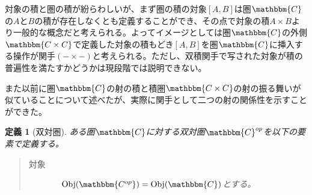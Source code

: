 \documentclass[dvipdfmx]{jsarticle}
\newcommand{\cat}[1]{\mathbbm{#1}}
\newcommand{\obj}[1]{\mathrm{Obj}(\cat{#1})}
\newcommand{\pcobj}[1]{[#1]}
\newtheorem{define}{定義}[section]
\numberwithin{proof}{subsection}
\numberwithin{prop}{subsection}
\numberwithin{define}{subsection}
\begin{document}
	対象の積と圏の積が紛らわしいが、まず圏の積の対象$\pcobj{A,B}$は圏$\cat{C}$の$A$と$B$の積が存在しなくとも定義することができ、その点で対象の積$A\times B$より一般的な概念だと考えられる。よってイメージとしては圏$\cat{C}$の外側$\cat{C\times C}$で定義した対象の積もどき$[A,B]$を圏$\cat{C}$に挿入する操作が関手$(-\times-)$と考えられる。ただし、双積関手で写された対象が積の普遍性を満たすかどうかは現段階では説明できない。

	また以前に圏$\cat{C}$の射の積と積圏$\cat{C\times C}$の射の振る舞いが似ていることについて述べたが、実際に関手として二つの射の関係性を示すことができた。
	\begin{define}[双対圏]
		ある圏$\cat{C}$に対する双対圏$\cat{C}^{op}$を以下の要素で定義する。
		\begin{quote}
			\begin{description}
				\item[対象]　$\obj{C^{op}}=\obj{C}$とする。


\end{description}
\end{quote}
\end{define}
\end{document}
